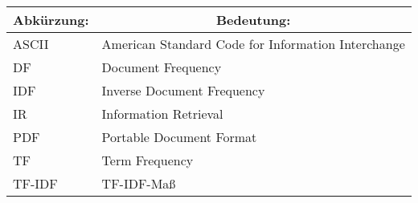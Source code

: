 \renewcommand{\arraystretch}{1.5}
\begin{center}
	\begin{tabular}{|l|l|}\hline
		\multicolumn{1}{|c|}{\textbf{Abkürzung:}} & \multicolumn{1}{c|}{\textbf{Bedeutung:}} \\ \hline
		ASCII & American Standard Code for Information Interchange \\ \hline
		DF & Document Frequency \\ \hline
		IDF & Inverse Document Frequency \\ \hline
		IR & Information Retrieval \\ \hline
		PDF & Portable Document Format \\ \hline
		TF & Term Frequency \\ \hline
		TF-IDF & TF-IDF-Maß \\ \hline
	\end{tabular}
\end{center}

